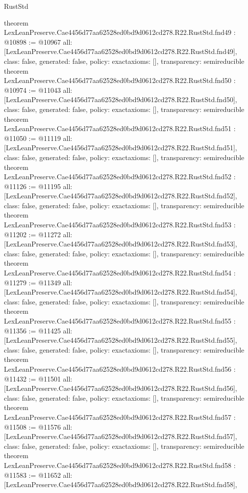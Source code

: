 \begin{lexlean}{RustStd}
\begin{coremodule}
{}
theorem LexLeanPreserve.Cae4456d77aa62528ed0bd9d0612cd278.R22.RustStd.fnd49 : @10898 := @10967 {
  all: [LexLeanPreserve.Cae4456d77aa62528ed0bd9d0612cd278.R22.RustStd.fnd49],
  class: false,
  generated: false,
  policy: exact{axioms: []},
  transparency: semireducible
}
theorem LexLeanPreserve.Cae4456d77aa62528ed0bd9d0612cd278.R22.RustStd.fnd50 : @10974 := @11043 {
  all: [LexLeanPreserve.Cae4456d77aa62528ed0bd9d0612cd278.R22.RustStd.fnd50],
  class: false,
  generated: false,
  policy: exact{axioms: []},
  transparency: semireducible
}
theorem LexLeanPreserve.Cae4456d77aa62528ed0bd9d0612cd278.R22.RustStd.fnd51 : @11050 := @11119 {
  all: [LexLeanPreserve.Cae4456d77aa62528ed0bd9d0612cd278.R22.RustStd.fnd51],
  class: false,
  generated: false,
  policy: exact{axioms: []},
  transparency: semireducible
}
theorem LexLeanPreserve.Cae4456d77aa62528ed0bd9d0612cd278.R22.RustStd.fnd52 : @11126 := @11195 {
  all: [LexLeanPreserve.Cae4456d77aa62528ed0bd9d0612cd278.R22.RustStd.fnd52],
  class: false,
  generated: false,
  policy: exact{axioms: []},
  transparency: semireducible
}
theorem LexLeanPreserve.Cae4456d77aa62528ed0bd9d0612cd278.R22.RustStd.fnd53 : @11202 := @11272 {
  all: [LexLeanPreserve.Cae4456d77aa62528ed0bd9d0612cd278.R22.RustStd.fnd53],
  class: false,
  generated: false,
  policy: exact{axioms: []},
  transparency: semireducible
}
theorem LexLeanPreserve.Cae4456d77aa62528ed0bd9d0612cd278.R22.RustStd.fnd54 : @11279 := @11349 {
  all: [LexLeanPreserve.Cae4456d77aa62528ed0bd9d0612cd278.R22.RustStd.fnd54],
  class: false,
  generated: false,
  policy: exact{axioms: []},
  transparency: semireducible
}
theorem LexLeanPreserve.Cae4456d77aa62528ed0bd9d0612cd278.R22.RustStd.fnd55 : @11356 := @11425 {
  all: [LexLeanPreserve.Cae4456d77aa62528ed0bd9d0612cd278.R22.RustStd.fnd55],
  class: false,
  generated: false,
  policy: exact{axioms: []},
  transparency: semireducible
}
theorem LexLeanPreserve.Cae4456d77aa62528ed0bd9d0612cd278.R22.RustStd.fnd56 : @11432 := @11501 {
  all: [LexLeanPreserve.Cae4456d77aa62528ed0bd9d0612cd278.R22.RustStd.fnd56],
  class: false,
  generated: false,
  policy: exact{axioms: []},
  transparency: semireducible
}
theorem LexLeanPreserve.Cae4456d77aa62528ed0bd9d0612cd278.R22.RustStd.fnd57 : @11508 := @11576 {
  all: [LexLeanPreserve.Cae4456d77aa62528ed0bd9d0612cd278.R22.RustStd.fnd57],
  class: false,
  generated: false,
  policy: exact{axioms: []},
  transparency: semireducible
}
theorem LexLeanPreserve.Cae4456d77aa62528ed0bd9d0612cd278.R22.RustStd.fnd58 : @11583 := @11652 {
  all: [LexLeanPreserve.Cae4456d77aa62528ed0bd9d0612cd278.R22.RustStd.fnd58],
}
\end{coremodule}
\end{lexlean}
